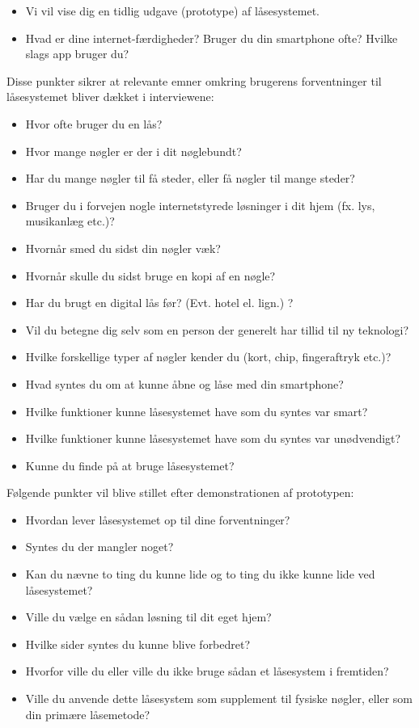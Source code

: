 \documentclass[a4paper,12pt]{article}
\begin{document}
\begin{itemize}
    \item Vi vil vise dig en tidlig udgave (prototype) af låsesystemet.
    \item Hvad er dine internet-færdigheder? Bruger du din smartphone ofte? Hvilke slags app bruger du?
\end{itemize}

Disse punkter sikrer at relevante emner omkring brugerens forventninger til låsesystemet bliver dækket i interviewene:

\begin{itemize}
    \item Hvor ofte bruger du en lås?
    \item Hvor mange nøgler er der i dit nøglebundt?
    \item Har du mange nøgler til få steder, eller få nøgler til mange steder?
    \item Bruger du i forvejen nogle internetstyrede løsninger i dit hjem (fx. lys, musikanlæg etc.)?
    \item Hvornår smed du sidst din nøgler væk?
    \item Hvornår skulle du sidst bruge en kopi af en nøgle?
    \item Har du brugt en digital lås før? (Evt. hotel el. lign.) ?
    \item Vil du betegne dig selv som en person der generelt har tillid til ny teknologi?
    \item Hvilke forskellige typer af nøgler kender du (kort, chip, fingeraftryk etc.)?
    \item Hvad syntes du om at kunne åbne og låse med din smartphone?
    \item Hvilke funktioner kunne låsesystemet have som du syntes var smart?
    \item Hvilke funktioner kunne låsesystemet have som du syntes var unødvendigt?
    \item Kunne du finde på at bruge låsesystemet?
\end{itemize}
Følgende punkter vil blive stillet efter demonstrationen af prototypen:

\begin{itemize}
    \item Hvordan lever låsesystemet op til dine forventninger?
    \item Syntes du der mangler noget?
    \item Kan du nævne to ting du kunne lide og to ting du ikke kunne lide ved låsesystemet?
    \item Ville du vælge en sådan løsning til dit eget hjem?
    \item Hvilke sider syntes du kunne blive forbedret?
    \item Hvorfor ville du eller ville du ikke bruge sådan et låsesystem i fremtiden?
    \item Ville du anvende dette låsesystem som supplement til fysiske nøgler, eller som din primære låsemetode?
\end{itemize}
\end{document}
